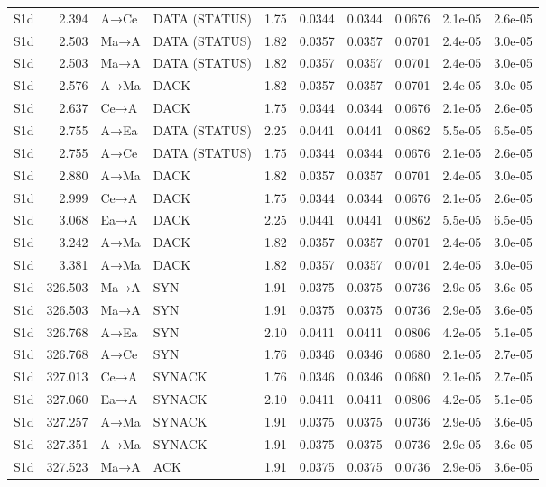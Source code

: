 \documentclass[10pt,letterpaper]{article}
\begin{document}
{\begin{longtable}{@{}lrllrrrrrr@{}}
S1d & 2.394 & A→Ce & DATA (STATUS) & 1.75 & 0.0344 & 0.0344 & 0.0676 & 2.1e-05 & 2.6e-05 \\
S1d & 2.503 & Ma→A & DATA (STATUS) & 1.82 & 0.0357 & 0.0357 & 0.0701 & 2.4e-05 & 3.0e-05 \\
S1d & 2.503 & Ma→A & DATA (STATUS) & 1.82 & 0.0357 & 0.0357 & 0.0701 & 2.4e-05 & 3.0e-05 \\
S1d & 2.576 & A→Ma & DACK & 1.82 & 0.0357 & 0.0357 & 0.0701 & 2.4e-05 & 3.0e-05 \\
S1d & 2.637 & Ce→A & DACK & 1.75 & 0.0344 & 0.0344 & 0.0676 & 2.1e-05 & 2.6e-05 \\
S1d & 2.755 & A→Ea & DATA (STATUS) & 2.25 & 0.0441 & 0.0441 & 0.0862 & 5.5e-05 & 6.5e-05 \\
S1d & 2.755 & A→Ce & DATA (STATUS) & 1.75 & 0.0344 & 0.0344 & 0.0676 & 2.1e-05 & 2.6e-05 \\
S1d & 2.880 & A→Ma & DACK & 1.82 & 0.0357 & 0.0357 & 0.0701 & 2.4e-05 & 3.0e-05 \\
S1d & 2.999 & Ce→A & DACK & 1.75 & 0.0344 & 0.0344 & 0.0676 & 2.1e-05 & 2.6e-05 \\
S1d & 3.068 & Ea→A & DACK & 2.25 & 0.0441 & 0.0441 & 0.0862 & 5.5e-05 & 6.5e-05 \\
S1d & 3.242 & A→Ma & DACK & 1.82 & 0.0357 & 0.0357 & 0.0701 & 2.4e-05 & 3.0e-05 \\
S1d & 3.381 & A→Ma & DACK & 1.82 & 0.0357 & 0.0357 & 0.0701 & 2.4e-05 & 3.0e-05 \\
S1d & 326.503 & Ma→A & SYN & 1.91 & 0.0375 & 0.0375 & 0.0736 & 2.9e-05 & 3.6e-05 \\
S1d & 326.503 & Ma→A & SYN & 1.91 & 0.0375 & 0.0375 & 0.0736 & 2.9e-05 & 3.6e-05 \\
S1d & 326.768 & A→Ea & SYN & 2.10 & 0.0411 & 0.0411 & 0.0806 & 4.2e-05 & 5.1e-05 \\
S1d & 326.768 & A→Ce & SYN & 1.76 & 0.0346 & 0.0346 & 0.0680 & 2.1e-05 & 2.7e-05 \\
S1d & 327.013 & Ce→A & SYNACK & 1.76 & 0.0346 & 0.0346 & 0.0680 & 2.1e-05 & 2.7e-05 \\
S1d & 327.060 & Ea→A & SYNACK & 2.10 & 0.0411 & 0.0411 & 0.0806 & 4.2e-05 & 5.1e-05 \\
S1d & 327.257 & A→Ma & SYNACK & 1.91 & 0.0375 & 0.0375 & 0.0736 & 2.9e-05 & 3.6e-05 \\
S1d & 327.351 & A→Ma & SYNACK & 1.91 & 0.0375 & 0.0375 & 0.0736 & 2.9e-05 & 3.6e-05 \\
S1d & 327.523 & Ma→A & ACK & 1.91 & 0.0375 & 0.0375 & 0.0736 & 2.9e-05 & 3.6e-05 \\

\end{longtable}}
\end{document}
